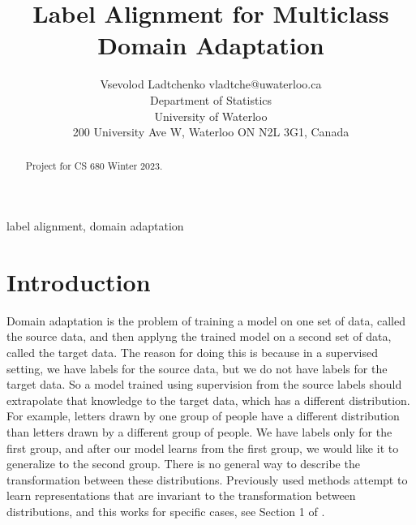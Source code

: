 \documentclass[twoside,11pt]{article}
\begin{document}
\title{Label Alignment for Multiclass Domain Adaptation}

\author{\name Vsevolod Ladtchenko \email vladtche@uwaterloo.ca \\
       \addr Department of Statistics\\
       University of Waterloo\\
       200 University Ave W, Waterloo ON N2L 3G1, Canada}

\editor{}

\maketitle

\begin{abstract}%
Project for CS 680 Winter 2023.
\end{abstract}

\begin{keywords}
  label alignment, domain adaptation
\end{keywords}

\section{Introduction}

Domain adaptation is the problem of training a model on one set of data, called the source data, and then applyng the trained model on a second set of data, called the target data. The reason for doing this is because in a supervised setting, we have labels for the source data, but we do not have labels for the target data. So a model trained using supervision from the source labels should extrapolate that knowledge to the target data, which has a different distribution. For example, letters drawn by one group of people have a different distribution than letters drawn by a different group of people. We have labels only for the first group, and after our model learns from the first group, we would like it to generalize to the second group. There is no general way to describe the transformation between these distributions. Previously used methods attempt to learn representations that are invariant to the transformation between distributions, and this works for specific cases, see Section 1 of \cite{imani2022label}. 
\end{document}
